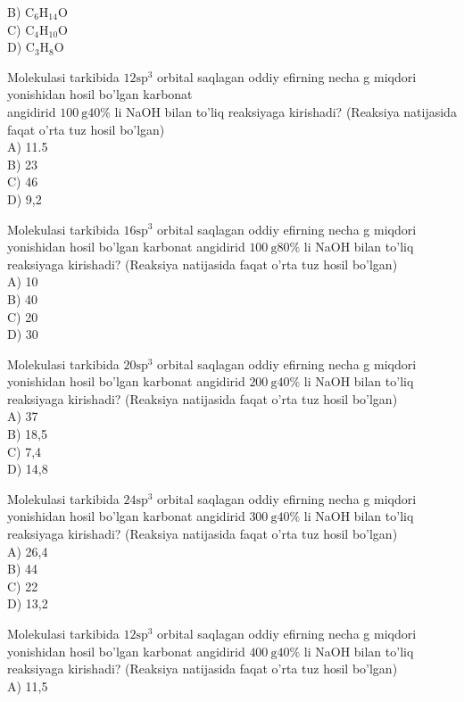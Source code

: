 B) $\mathrm{C}_{6} \mathrm{H}_{14} \mathrm{O}$\\
C) $\mathrm{C}_{4} \mathrm{H}_{10} \mathrm{O}$\\
D) $\mathrm{C}_{3} \mathrm{H}_{8} \mathrm{O}$
  \item Molekulasi tarkibida $12 \mathrm{sp}^{3}$ orbital saqlagan oddiy efirning necha g miqdori yonishidan hosil bo'lgan karbonat\\
angidirid $100 \mathrm{~g} 40 \%$ li NaOH bilan to'liq reaksiyaga kirishadi? (Reaksiya natijasida faqat o'rta tuz hosil bo'lgan)\\
A) 11.5\\
B) 23\\
C) 46\\
D) 9,2
  \item Molekulasi tarkibida $16 \mathrm{sp}^{3}$ orbital saqlagan oddiy efirning necha g miqdori yonishidan hosil bo'lgan karbonat angidirid $100 \mathrm{~g} 80 \%$ li NaOH bilan to'liq reaksiyaga kirishadi? (Reaksiya natijasida faqat o'rta tuz hosil bo'lgan)\\
A) 10\\
B) 40\\
C) 20\\
D) 30
  \item Molekulasi tarkibida $20 \mathrm{sp}^{3}$ orbital saqlagan oddiy efirning necha g miqdori yonishidan hosil bo'lgan karbonat angidirid $200 \mathrm{~g} 40 \%$ li NaOH bilan to'liq reaksiyaga kirishadi? (Reaksiya natijasida faqat o'rta tuz hosil bo'lgan)\\
A) 37\\
B) 18,5\\
C) 7,4\\
D) 14,8
  \item Molekulasi tarkibida $24 \mathrm{sp}^{3}$ orbital saqlagan oddiy efirning necha g miqdori yonishidan hosil bo'lgan karbonat angidirid $300 \mathrm{~g} 40 \%$ li NaOH bilan to'liq reaksiyaga kirishadi? (Reaksiya natijasida faqat o'rta tuz hosil bo'lgan)\\
A) 26,4\\
B) 44\\
C) 22\\
D) 13,2
  \item Molekulasi tarkibida $12 \mathrm{sp}^{3}$ orbital saqlagan oddiy efirning necha g miqdori yonishidan hosil bo'lgan karbonat angidirid $400 \mathrm{~g} 40 \%$ li NaOH bilan to'liq reaksiyaga kirishadi? (Reaksiya natijasida faqat o'rta tuz hosil bo'lgan)\\
A) 11,5\\
